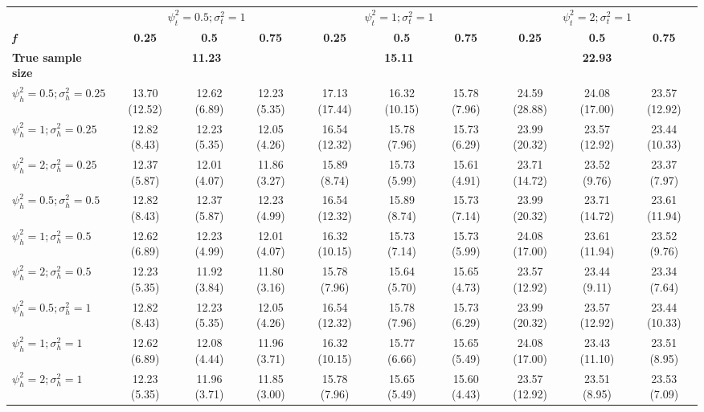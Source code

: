 \begin{table}[ht]
{\begin{tabular}{l c c c c c c c c c}
\hline 
 & \multicolumn{3}{c}{$\psi_t^2 = 0.5; \sigma_t^2 = 1$} & \multicolumn{3}{c}{$\psi_t^2 = 1; \sigma_t^2 = 1$} & \multicolumn{3}{c}{$\psi_t^2 = 2; \sigma_t^2 = 1$} \\
\addlinespace[1pt]
\cmidrule(lr){2-4} \cmidrule(lr){5-7} \cmidrule(lr){8-10}
\textbf{\textit{f}} & \textbf{0.25} & \textbf{0.5} & \textbf{0.75} & \textbf{0.25} & \textbf{0.5} & \textbf{0.75} & \textbf{0.25} & \textbf{0.5} & \textbf{0.75} \\
\hline
\textbf{True sample size} & \multicolumn{3}{c}{\textbf{11.23}} & \multicolumn{3}{c}{\textbf{15.11}} & \multicolumn{3}{c}{\textbf{22.93}} \\
$\psi_h^2 = 0.5; \sigma_h^2 = 0.25$ & 13.70 (12.52) & 12.62 (6.89) & 12.23 (5.35) & 17.13 (17.44) & 16.32 (10.15) & 15.78 (7.96) & 24.59 (28.88) & 24.08 (17.00) & 23.57 (12.92) \\
$\psi_h^2 = 1; \sigma_h^2 = 0.25$ & 12.82 (8.43) & 12.23 (5.35) & 12.05 (4.26) & 16.54 (12.32) & 15.78 (7.96) & 15.73 (6.29) & 23.99 (20.32) & 23.57 (12.92) & 23.44 (10.33) \\
$\psi_h^2 = 2; \sigma_h^2 = 0.25$ & 12.37 (5.87) & 12.01 (4.07) & 11.86 (3.27) & 15.89 (8.74) & 15.73 (5.99) & 15.61 (4.91) & 23.71 (14.72) & 23.52 (9.76) & 23.37 (7.97) \\
$\psi_h^2 = 0.5; \sigma_h^2 = 0.5$ & 12.82 (8.43) & 12.37 (5.87) & 12.23 (4.99) & 16.54 (12.32) & 15.89 (8.74) & 15.73 (7.14) & 23.99 (20.32) & 23.71 (14.72) & 23.61 (11.94) \\
$\psi_h^2 = 1; \sigma_h^2 = 0.5$ & 12.62 (6.89) & 12.23 (4.99) & 12.01 (4.07) & 16.32 (10.15) & 15.73 (7.14) & 15.73 (5.99) & 24.08 (17.00) & 23.61 (11.94) & 23.52 (9.76) \\
$\psi_h^2 = 2; \sigma_h^2 = 0.5$ & 12.23 (5.35) & 11.92 (3.84) & 11.80 (3.16) & 15.78 (7.96) & 15.64 (5.70) & 15.65 (4.73) & 23.57 (12.92) & 23.44 (9.11) & 23.34 (7.64) \\
$\psi_h^2 = 0.5; \sigma_h^2 = 1$ & 12.82 (8.43) & 12.23 (5.35) & 12.05 (4.26) & 16.54 (12.32) & 15.78 (7.96) & 15.73 (6.29) & 23.99 (20.32) & 23.57 (12.92) & 23.44 (10.33) \\
$\psi_h^2 = 1; \sigma_h^2 = 1$ & 12.62 (6.89) & 12.08 (4.44) & 11.96 (3.71) & 16.32 (10.15) & 15.77 (6.66) & 15.65 (5.49) & 24.08 (17.00) & 23.43 (11.10) & 23.51 (8.95) \\
$\psi_h^2 = 2; \sigma_h^2 = 1$ & 12.23 (5.35) & 11.96 (3.71) & 11.85 (3.00) & 15.78 (7.96) & 15.65 (5.49) & 15.60 (4.43) & 23.57 (12.92) &  23.51 (8.95) & 23.53 (7.09) \\
\bottomrule
\end{tabular}}
\end{table}


